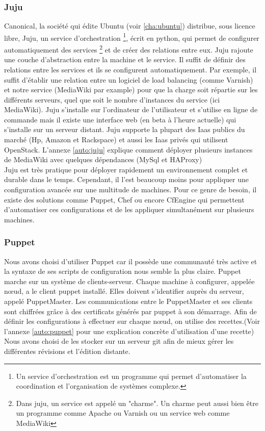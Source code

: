 \documentclass[a4paper,oneside]{report}
\begin{document}
\subsubsection{Juju}
Canonical, la société qui édite Ubuntu (voir \ref{cha:ubuntu}) distribue, sous licence libre, Juju, un service d'orchestration
\footnote{Un service d'orchestration est un programme qui permet d'automatiser la coordination et l'organisation de systèmes complexe.}, 
écrit en python, qui permet de configurer automatiquement des services
\footnote{Dans juju, un service est appelé un "charme". Un charme peut aussi bien être un programme comme Apache ou Varnish ou un service web comme MediaWiki} 
et de créer des relations entre eux. 
Juju rajoute une couche d'abstraction entre la machine et le service. Il suffit de définir des relations entre les services et ils se configurent automatiquement. 
Par exemple, il suffit d'établir une relation entre un logiciel de load balancing (comme Varnish) et notre service (MediaWiki par example) pour que la charge soit répartie sur les différents serveurs, quel que soit le nombre d'instances du service (ici MediaWiki).
Juju s'installe sur l'ordinateur de l'utilisateur et s'utilise en ligne de commande mais il existe une interface web (en beta à l'heure actuelle) qui s'installe sur un serveur distant.
Juju supporte la plupart des Iaas publics du marché (Hp, Amazon et Rackspace) et aussi les Iaas privés qui utilisent OpenStack.
L'annexe \ref{auto:juju} explique comment déployer plusieurs instances de MediaWiki avec quelques dépendances (MySql et HAProxy)
\newline\\
Juju est très pratique pour déployer rapidement un environnement complet et durable dans le temps. 
Cependant, il l'est beaucoup moins pour appliquer une configuration avancée sur une multitude de machines.
Pour ce genre de besoin, il existe des solutions comme Puppet, Chef ou encore CfEngine qui permettent d'automatiser ces configurations et de les appliquer simultanément sur plusieurs machines.

\subsubsection{Puppet} 
Nous avons choisi d'utiliser Puppet car il possède une communauté très active et la syntaxe de ses scripts de configuration nous semble la plus claire.
Puppet marche sur un système de clients-serveur.
Chaque machine à configurer, appelée nœud, a le client puppet installé.
Elles doivent s'identifier auprès du serveur, appelé PuppetMaster.
Les communications entre le PuppetMaster et ses clients sont chiffrées grâce à des certificats générés par puppet à son démarrage.
Afin de définir les configurations à effectuer sur chaque nœud, on utilise des recettes.(Voir l'annexe \ref{auto:puppet} pour une explication concrète d'utilisation d'une recette)
Nous avons choisi de les stocker sur un serveur git afin de mieux gérer les différentes révisions et l'édition distante.
\end{document}
